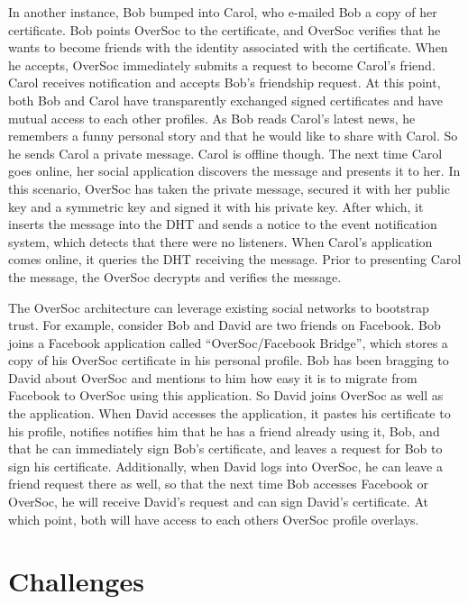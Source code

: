 \documentclass{IEEEtran}
\begin{document}
In another instance, Bob bumped into Carol, who e-mailed Bob a copy of her
certificate.  Bob points OverSoc to the certificate, and OverSoc verifies that
he wants to become friends with the identity associated with the certificate.
When he accepts, OverSoc immediately submits a request to become Carol's
friend.  Carol receives notification and accepts Bob's friendship request.  At
this point, both Bob and Carol have transparently exchanged signed certificates
and have mutual access to each other profiles.  As Bob reads Carol's latest
news, he remembers a funny personal story and that he would like to share with
Carol.  So he sends Carol a private message.  Carol is offline though.  The
next time Carol goes online, her social application discovers the message and
presents it to her.  In this scenario, OverSoc  has taken the private message,
secured it with her public key and a symmetric key and signed it with his
private key.  After which, it inserts the message into the DHT and sends a
notice to the event notification system, which detects that there were no
listeners.  When Carol's application comes online, it queries the DHT receiving
the message.  Prior to presenting Carol the message, the OverSoc decrypts and
verifies the message.

The OverSoc architecture can leverage existing social networks to bootstrap
trust.  For example, consider Bob and David are two friends on Facebook.  Bob
joins a Facebook application called ``OverSoc/Facebook Bridge'', which stores
a copy of his OverSoc certificate in his personal profile.  Bob has been
bragging to David about OverSoc and mentions to him how easy it is to migrate
from Facebook to OverSoc using this application.  So David joins OverSoc as
well as the application.  When David accesses the application, it pastes his
certificate to his profile, notifies notifies him that he has a friend already
using it, Bob, and that he can immediately sign Bob's certificate, and leaves a
request for Bob to sign his certificate.  Additionally, when David logs into
OverSoc, he can leave a friend request there as well, so that the next time
Bob accesses Facebook or OverSoc, he will receive David's request and can sign
David's certificate.  At which point, both will have access to each others
OverSoc profile overlays.  

\section{Challenges}
\label{outstanding}
\end{document}
